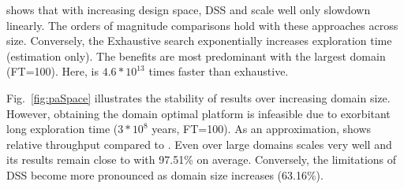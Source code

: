  shows that with increasing design space, DSS and \ga scale well only slowdown linearly. The orders of magnitude comparisons hold with these approaches across size. Conversely, the Exhaustive search exponentially increases exploration time (estimation only). The benefits are most predominant with the largest domain (FT=100). Here, \gah is $4.6*10^{13}$ times faster than exhaustive.

Fig.~\ref{fig:paSpace} illustrates the stability of results over increasing domain size. However, obtaining the domain optimal platform is infeasible due to exorbitant long exploration time ($3*10^8$ years, FT=100). As an approximation,  shows relative throughput compared to \gaana. Even over large domains \gah scales very well and its results remain close to \gaana with 97.51\% on average. Conversely, the limitations of DSS become more pronounced as domain size increases (63.16\%).



